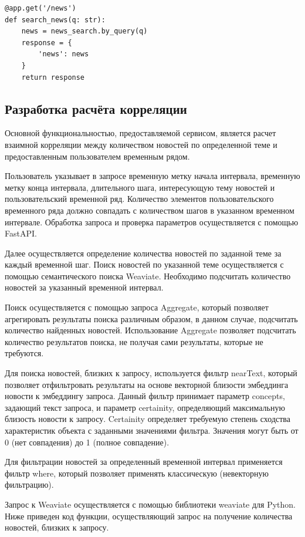 \begin{lstlisting}
@app.get('/news')
def search_news(q: str):
    news = news_search.by_query(q)
    response = {
        'news': news
    }
    return response
\end{lstlisting}

\subsection{Разработка расчёта корреляции}

Основной функциональностью, предоставляемой сервисом, является расчет взаимной корреляции между количеством новостей по определенной теме и предоставленным пользователем временным рядом.

Пользователь указывает в запросе временную метку начала интервала, временную метку конца интервала, длительного шага, интересующую тему новостей и пользовательский временной ряд. Количество элементов пользовательского временного ряда должно совпадать с количеством шагов в указанном временном интервале. Обработка запроса и проверка параметров осуществляется с помощью FastAPI.

Далее осуществляется определение количества новостей по заданной теме за каждый временной шаг. Поиск новостей по указанной теме осуществляется с помощью семантического поиска Weaviate. Необходимо подсчитать количество новостей за указанный временной интервал.

Поиск осуществляется с помощью запроса Aggregate, который позволяет агрегировать результаты поиска различным образом, в данном случае, подсчитать количество найденных новостей. Использование Aggregate позволяет подсчитать количество результатов поиска, не получая сами результаты, которые не требуются.

Для поиска новостей, близких к запросу, используется фильтр nearText, который позволяет отфильтровать результаты на основе векторной близости эмбеддинга новости к эмбеддингу запроса. Данный фильтр принимает параметр concepts, задающий текст запроса, и параметр certainity, определяющий максимальную близость новости к запросу. Certainity определяет требуемую степень сходства характеристик объекта с заданными значениями фильтра. Значения могут быть от 0 (нет совпадения) до 1 (полное совпадение).

Для фильтрации новостей за определенный временной интервал применяется фильтр where, который позволяет применять классическую (невекторную фильтрацию).

Запрос к Weaviate осуществляется с помощью библиотеки weaviate для Python. Ниже приведен код функции, осуществляющий запрос на получение количества новостей, близких к запросу.

